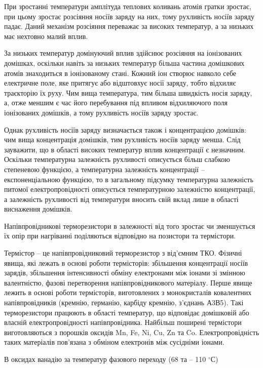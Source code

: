 \documentclass[a4paper,14pt]{extreport}
\begin{document}
  При зростанні температури амплітуда теплових коливань атомів гратки
  зростає, при цьому зростає розсіяння носіїв заряду на них, тому рухливість носіїв
  заряду падає. Даний механізм розсіяння переважає за високих температур, а за
  низьких має нехтовно малий вплив.\par
  За низьких температур домінуючий вплив здійснює розсіяння на іонізованих
  домішках, оскільки навіть за низьких температур більша частина домішкових
  атомів знаходиться в іонізованому стані. Кожний іон створює навколо себе
  електричне поле, яке притягує або відштовхує носії заряду, тобто відхиляє
  траєкторію їх руху. Чим вища температура, тим більша швидкість носія заряду, а,
  отже меншим є час його перебування під впливом відхиляючого поля іонізованих
  домішків, а тому рухливість носіїв заряду зростає.\par
  Однак рухливість носіїв заряду визначається також і концентрацією
  домішків: чим вища концентрація домішків, тим рухливість носіїв заряду менша.
  Слід зауважити, що в області високих температур вплив концентрації є незначним.
  Оскільки температурна залежність рухливості описується більш слабкою
  степеневою функцією, а температурна залежність концентрації –
  експоненціальною функцією, то в загальному підсумку температурна залежність
  питомої електропровідності описується температурною залежністю концентрації,
  а залежність рухливості від температури вносить свій вклад лише в області
  виснаження домішків.\par
  Напівпровідникові терморезистори в залежності від того зростає чи
  зменшується їх опір при нагріванні поділяються відповідно на позистори та
  термістори.\par
  Термістор – це напівпровідниковий терморезистор з від’ємним ТКО.
  Фізичні явища, які лежать в основі роботи термісторів: збільшення концентрації
  носіїв зарядів, збільшення інтенсивності обміну електронами між іонами зі
  змінною валентністю, фазові перетворення напівпровідникового матеріалу.
  Перше явище лежить в основі роботи термісторів, виготовлених з
  монокристалів ковалентних напівпровідників (кремнію, германію, карбіду
  кремнію, з’єднань А3В5). Такі терморезистори працюють в області температур, що
  відповідає домішковій або власній електропровідності напівпровідника.
  Найбільш поширені термістори виготовляються з порошків оксидів Mn, Fe,
  Ni, Cu, Zn та Co. Електропровідність таких матеріалів пов’язана з обміном
  електронів між сусідніми іонами.\par
  В оксидах ванадію за температур фазового переходу (68 та – 110 $^\circ$С)
\end{document}
